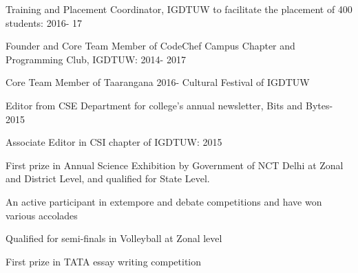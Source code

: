 \documentclass[]{resume-openfont}
\begin{document}
\begin{minipage}[t]{0.66\textwidth}
\begin{tightemize}
\item Training and Placement Coordinator, IGDTUW to facilitate the placement of 400 students: 2016- 17
\item Founder and Core Team Member of CodeChef Campus Chapter and Programming Club, IGDTUW: 2014- 2017
\item Core Team Member of Taarangana 2016- Cultural Festival of IGDTUW \\
\item Editor from CSE Department for college’s annual newsletter, Bits and Bytes- 2015
\item Associate Editor in CSI chapter of IGDTUW: 2015 \\
\end{tightemize}
\sectionsep

\begin{tightemize}
\item First prize in Annual Science Exhibition by Government of NCT Delhi at Zonal and District Level, and qualified for State Level.
\item An active participant in extempore and debate competitions and have won various accolades
\item Qualified for semi-finals in Volleyball at Zonal level
\item First prize in TATA essay writing competition
\end{tightemize}

\end{minipage} 
\end{document}
